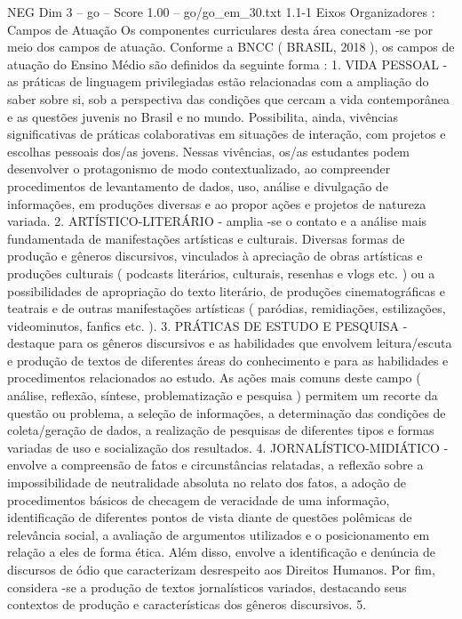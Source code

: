 \begin{textsample}{NEG Dim 3 – go – Score 1.00 – go/go\_em\_30.txt}  \label{ex:f3_neg_250}
1.1-1 Eixos Organizadores : Campos de Atuação Os componentes curriculares desta área conectam -se por meio dos campos de atuação.
Conforme a BNCC ( BRASIL, 2018 ), os campos de atuação do Ensino Médio são definidos da seguinte forma : 1.
VIDA PESSOAL - as práticas de linguagem privilegiadas estão relacionadas com a ampliação do saber sobre si, sob a perspectiva das condições que cercam a vida contemporânea e as questões juvenis no Brasil e no mundo.
Possibilita, ainda, vivências significativas de práticas colaborativas em situações de interação, com projetos e escolhas pessoais dos/as jovens.
Nessas vivências, os/as estudantes podem desenvolver o protagonismo de modo contextualizado, ao compreender procedimentos de levantamento de dados, uso, análise e divulgação de informações, em produções diversas e ao propor ações e projetos de natureza variada. 2.
ARTÍSTICO-LITERÁRIO - amplia -se o contato e a análise mais fundamentada de manifestações artísticas e culturais.
Diversas formas de produção e gêneros discursivos, vinculados à apreciação de obras artísticas e produções culturais ( podcasts literários, culturais, resenhas e vlogs etc. ) ou a possibilidades de apropriação do texto literário, de produções cinematográficas e teatrais e de outras manifestações artísticas ( paródias, remidiações, estilizações, videominutos, fanfics etc. ). 3.
PRÁTICAS DE ESTUDO E PESQUISA - destaque para os gêneros discursivos e as habilidades que envolvem leitura/escuta e produção de textos de diferentes áreas do conhecimento e para as habilidades e procedimentos relacionados ao estudo.
As ações mais comuns deste campo ( análise, reflexão, síntese, problematização e pesquisa ) permitem um recorte da questão ou problema, a seleção de informações, a determinação das condições de coleta/geração de dados, a realização de pesquisas de diferentes tipos e formas variadas de uso e socialização dos resultados. 4.
JORNALÍSTICO-MIDIÁTICO - envolve a compreensão de fatos e circunstâncias relatadas, a reflexão sobre a impossibilidade de neutralidade absoluta no relato dos fatos, a adoção de procedimentos básicos de checagem de veracidade de uma informação, identificação de diferentes pontos de vista diante de questões polêmicas de relevância social, a avaliação de argumentos utilizados e o posicionamento em relação a eles de forma ética.
Além disso, envolve a identificação e denúncia de discursos de ódio que caracterizam desrespeito aos Direitos Humanos.
Por fim, considera -se a produção de textos jornalísticos variados, destacando seus contextos de produção e características dos gêneros discursivos. 5.

\end{textsample}
